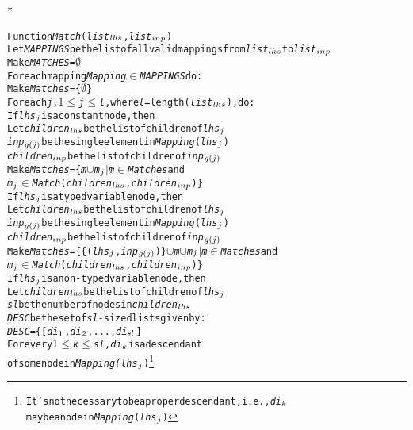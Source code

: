 \pagestyle{empty}

*\vspace{-0.6in}
\begin{alltt}
   Function {\it{}Match} ({\it{}list}\(\sb{lhs}\), {\it{}list}\(\sb{inp}\))
       Let {\it{}MAPPINGS} be the list of all valid mappings from {\it{}list\(\sb{lhs}\)} to {\it{}list}\(\sb{inp}\)
       Make {\it{}MATCHES} = \(\emptyset\)
       For each mapping {\it{}Mapping} \(\in\) {\it{}MAPPINGS} do:
           Make {\it{}Matches} = \{\(\emptyset\)\}
           For each {\it{}j}, \(1\leq\){\it{}j}\(\leq\){\it{}l}, where {\it{}l}=length({\it{}list}\(\sb{lhs}\)), do: 
               If {\it{}lhs}\(\sb{j}\) is a constant node, then 
                  Let {\it{}children}\(\sb{lhs}\) be the list of children of {\it{}lhs}\(\sb{j}\) 
                      {\it{}inp}\(\sb{g(j)}\) be the single element in {\it{}Mapping}({\it{}lhs}\(\sb{j}\))
                      {\it{}children}\(\sb{inp}\) be the list of children of {\it{}inp}\(\sb{g(j)}\) 
                  Make {\it{}Matches} = \{{\it{}m}\(\cup\){\it{}m}\(\sb{j}\) \(\mid\) {\it{}m} \(\in\) {\it{}Matches} and 
                                          {\it{}m}\(\sb{j}\) \(\in\) {\it{}Match}({\it{}children}\(\sb{lhs}\), {\it{}children}\(\sb{inp}\))\}  
               If {\it{}lhs}\(\sb{j}\) is a typed variable node, then 
                  Let {\it{}children}\(\sb{lhs}\) be the list of children of {\it{}lhs}\(\sb{j}\)
                      {\it{}inp}\(\sb{g(j)}\) be the single element in {\it{}Mapping}({\it{}lhs}\(\sb{j}\))
                      {\it{}children}\(\sb{inp}\) be the list of children of {\it{}inp}\(\sb{g(j)}\)
                  Make {\it{}Matches} = \{ \{({\it{}lhs}\(\sb{j}\),{\it{}inp}\(\sb{g(j)}\))\}\(\cup\){\it{}m}\(\cup\){\it{}m}\(\sb{j}\) \(\mid\) {\it{}m} \(\in\) {\it{}Matches} and
                                         {\it{}m}\(\sb{j}\) \(\in\) {\it{}Match}({\it{}children}\(\sb{lhs}\), {\it{}children}\(\sb{inp}\)) \}
               If {\it{}lhs}\(\sb{j}\) is a non-typed variable node, then 
                  Let {\it{}children}\(\sb{lhs}\) be the list of children of {\it{}lhs}\(\sb{j}\)
                      {\it{}sl} be the number of nodes in {\it{}children}\(\sb{lhs}\)
                      {\it{}DESC} be the set of {\it{}sl}-sized lists given by:
                             {\it{}DESC} = \{[{\it{}di}\(\sb{1}\),{\it{}di}\(\sb{2}\),...,{\it{}di}\(\sb{sl}\)] \(\mid\)
                                   For every \(1\leq\){\it{}k}\(\leq\){\it{}sl}, {\it{}di}\(\sb{k}\) is a descendant
                                               of some node in {\it{}Mapping(lhs}\(\sb{j}\))\footnote{It's not necessary to be a proper descendant, i.e., {\it{}di}\(\sb{k}\) may be a node in {\it{}Mapping}({\it{}lhs}\(\sb{j}\))}

\end{alltt}
